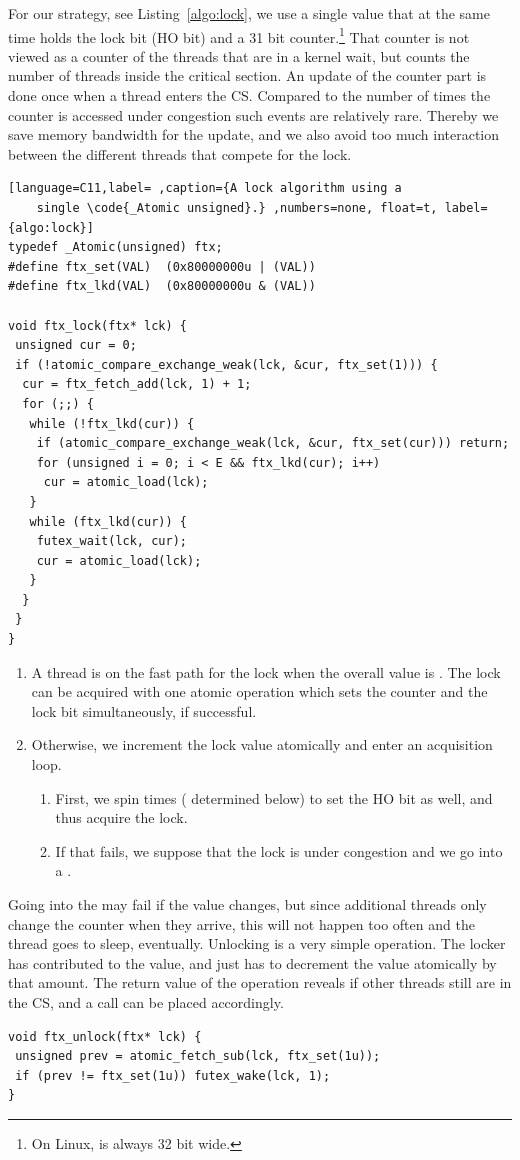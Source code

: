 For our strategy, see Listing~\ref{algo:lock}, we use a single  value that at the same
time holds the lock bit (HO bit) and a 31 bit counter.\footnote{On Linux,  is always 32 bit wide.}
That counter
is not viewed as a counter of the threads that are in a kernel wait, but
counts the number of threads inside the critical
section.  An update of the counter part is done once when a
thread enters the CS.
Compared to the number of times
the counter is accessed under congestion such events are relatively
rare. Thereby we save memory bandwidth for the update, and we also
avoid too much interaction between the different threads that
compete for the lock.
\begin{lstlisting}[language=C11,label= ,caption={A lock algorithm using a
    single \code{_Atomic unsigned}.} ,numbers=none, float=t, label={algo:lock}]
typedef _Atomic(unsigned) ftx;
#define ftx_set(VAL)  (0x80000000u | (VAL))
#define ftx_lkd(VAL)  (0x80000000u & (VAL))

void ftx_lock(ftx* lck) {
 unsigned cur = 0;
 if (!atomic_compare_exchange_weak(lck, &cur, ftx_set(1))) {
  cur = ftx_fetch_add(lck, 1) + 1;
  for (;;) {
   while (!ftx_lkd(cur)) {
    if (atomic_compare_exchange_weak(lck, &cur, ftx_set(cur))) return;
    for (unsigned i = 0; i < E && ftx_lkd(cur); i++)
     cur = atomic_load(lck);
   }
   while (ftx_lkd(cur)) {
    futex_wait(lck, cur);
    cur = atomic_load(lck);
   }
  }
 }
}
\end{lstlisting}

\itemadjust
\begin{enumerate}
\item A thread is on the fast path for the lock when the overall value
is . The lock can be acquired with one atomic operation which sets
the counter and the lock bit simultaneously, if successful.
\itemadjust
\item Otherwise, we increment the lock value atomically and enter an
  acquisition loop.\itemadjust
\begin{enumerate}
\item First, we spin  times
( determined below) to set the HO
bit as well, and thus
acquire the lock.
\item If that fails,
we suppose that the lock is under congestion and
we go into a .
\itemadjust
\end{enumerate}
\end{enumerate}
Going into the  may fail if the value changes, but
since additional threads only change the counter when they arrive,
this will not happen too often and the thread goes to sleep,
eventually.
Unlocking is a very simple operation. The locker has contributed
 to the value, and just has to decrement the value
atomically by that amount.  The return value of the operation
reveals if other threads still are in the CS, and a
 call can be placed accordingly.
\lstset{language=C11,label= ,caption= ,numbers=none}
\begin{lstlisting}
void ftx_unlock(ftx* lck) {
 unsigned prev = atomic_fetch_sub(lck, ftx_set(1u));
 if (prev != ftx_set(1u)) futex_wake(lck, 1);
}
\end{lstlisting}

